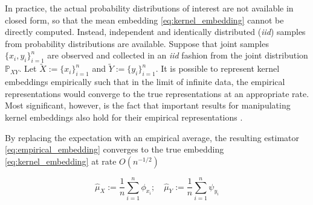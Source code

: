 \documentclass[twoside]{article} \usepackage{aistats2017}
\theoremstyle{definition}
\theoremstyle{theorem}
\newcommand{\rv}[1]{{#1}}
\newcommand{\ds}[1]{\tilde{#1}}
\newcommand{\inner}[2]{{\langle #1, #2 \rangle}}
\newcommand{\hatmuX}{\hat{\mu}_{\rv{X}}}
\newcommand{\hatmuY}{\hat{\mu}_{\rv{Y}}}
\begin{document}
			In practice, the actual probability distributions of interest are not available in closed form, so that the mean embedding \eqref{eq:kernel_embedding} cannot be directly computed. Instead, independent and identically distributed (\textit{iid}) samples from probability distributions are available. Suppose that joint samples $\{x_{i}, y_{i}\}_{i = 1}^{n}$ are observed and collected in an \textit{iid} fashion from the joint distribution $\mathbb{P}_{\rv{X} \rv{Y}}$. Let $\ds{X} := \{x_{i}\}_{i = 1}^{n}$ and $\ds{Y} := \{y_{i}\}_{i = 1}^{n}$. It is possible to represent kernel embeddings empirically such that in the limit of infinite data, the empirical representations would converge to the true representations at an appropriate rate. Most significant, however, is the fact that important results for manipulating kernel embeddings also hold for their empirical representations \citep{muandet2016kernel}.
			
			By replacing the expectation with an empirical average, the resulting estimator \eqref{eq:empirical_embedding} converges to the true embedding \eqref{eq:kernel_embedding} at rate $O(n^{-1/2})$ \citep{smola2007hilbert}

			\begin{equation}
				\hatmuX := \frac{1}{n} \sum_{i = 1}^{n} \phi_{x_{i}} ;\quad \hatmuY := \frac{1}{n} \sum_{i = 1}^{n} \psi_{y_{i}}
			\label{eq:empirical_embedding}
			\end{equation}

%
\end{document}
